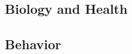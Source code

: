 \documentclass[letterpaper,man,apacite]{apa6}
\begin{document}
\subsection{Biology and Health}


\subsection{Behavior}
\end{document}
